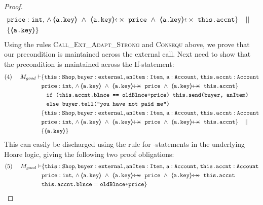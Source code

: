 \begin{proof}
\begin{align*}
				& \prg{price} : \prg{int},\,
				  \wedge\, 
				  {\inside{\prg{a.key}}}\ \wedge\ 
				  \protectedFrom{\prg{a.key}}{\prg{price}}\ \wedge\ 
				   \protectedFrom{\prg{a.key}}{\prg{this.accnt}}\} \ \ \  || \ \ \ \\
		  		& \{ {\inside{\prg{a.key}}} \}
\end{align*}
\normalsize
Using the rules \textsc{Call\_Ext\_Adapt\_Strong} and \textsc{Consequ} above, we prove that our precondition is maintained across the external call. 
Next need to show that the precondition is maintained across the If-statement:
\small
\begin{align*}
\text{(4)}  \ \ \ \ M_{good} \vdash & \{  \prg{this}:\prg{Shop}, \prg{buyer} : \prg{external}, \prg{anItem} : \prg{Item},\, \prg{a}:\prg{Account},\, \prg{this.accnt}:\prg{Account}\\
				& \prg{price} : \prg{int},\,
				  \wedge\, 
				  {\inside{\prg{a.key}}}\ \wedge\ 
				  \protectedFrom{\prg{a.key}}{\prg{price}}\ \wedge\ 
				   \protectedFrom{\prg{a.key}}{\prg{this.accnt}}\} \\
		  		&\;\;\; \prg{if (this.accnt.blnce == oldBlnce+price) this.send(buyer, anItem)}\ \\  
				&\;\;\;  \prg{else buyer.tell("you have not paid me")}\\
		  		& \{  \prg{this}:\prg{Shop}, \prg{buyer} : \prg{external}, \prg{anItem} : \prg{Item},\, \prg{a}:\prg{Account},\, \prg{this.accnt}:\prg{Account}\\
				& \prg{price} : \prg{int},\,
				  \wedge\, 
				  {\inside{\prg{a.key}}}\ \wedge\ 
				  \protectedFrom{\prg{a.key}}{\prg{price}}\ \wedge\ 
				   \protectedFrom{\prg{a.key}}{\prg{this.accnt}}\} \ \ \  || \ \ \ \\
		  		& \{ {\inside{\prg{a.key}}} \}
\end{align*}
\normalsize
This can easily be discharged using the rule for -statements in the underlying Hoare logic, giving the following two proof obligations:
\small
\begin{align*}
\text{(5)}  \ \ \ \ M_{good} \vdash & \{  \prg{this}:\prg{Shop}, \prg{buyer} : \prg{external}, \prg{anItem} : \prg{Item},\, \prg{a}:\prg{Account},\, \prg{this.accnt}:\prg{Account}\\
				& \prg{price} : \prg{int},\,
				  \wedge\, 
				  {\inside{\prg{a.key}}}\ \wedge\ 
				  \protectedFrom{\prg{a.key}}{\prg{price}}\ \wedge\ 
				   \protectedFrom{\prg{a.key}}{\prg{this.accnt}} \\
				& \prg{this.accnt.blnce} = \prg{oldBlnce+price}\} \\

\end{align*}
\end{proof}

